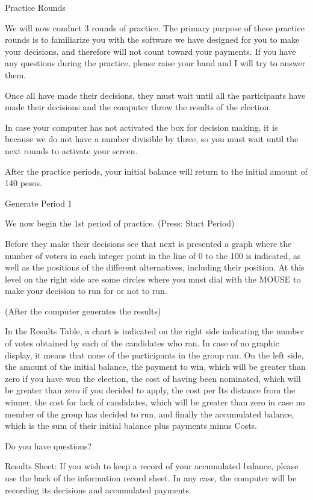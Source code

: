 Practice Rounds

We will now conduct 3 rounds of practice. The primary purpose of these practice rounds is to familiarize you with the software we have designed for you to make your decisions, and therefore will not count toward your payments. If you have any questions during the practice, please raise your hand and I will try to answer them.

Once all have made their decisions, they must wait until all the participants have made their decisions and the computer throw the results of the election.

In case your computer has not activated the box for decision making, it is because we do not have a number divisible by three, so you must wait until the next rounds to activate your screen.

After the practice periods, your initial balance will return to the initial amount of 140 pesos.

Generate Period 1

We now begin the 1st period of practice. (Press: Start Period)

Before they make their decisions see that next is presented a graph where the number of voters in each integer point in the line of 0 to the 100 is indicated, as well as the positions of the different alternatives, including their position. At this level on the right side are some circles where you must dial with the MOUSE to make your decision to run for or not to run.

(After the computer generates the results)

In the Results Table, a chart is indicated on the right side indicating the number of votes obtained by each of the candidates who ran. In case of no graphic display, it means that none of the participants in the group ran. On the left side, the amount of the initial balance, the payment to win, which will be greater than zero if you have won the election, the cost of having been nominated, which will be greater than zero if you decided to apply, the cost per Its distance from the winner, the cost for lack of candidates, which will be greater than zero in case no member of the group has decided to run, and finally the accumulated balance, which is the sum of their initial balance plus payments minus Costs.

Do you have questions?

Results Sheet: If you wish to keep a record of your accumulated balance, please use the back of the information record sheet. In any case, the computer will be recording its decisions and accumulated payments.

